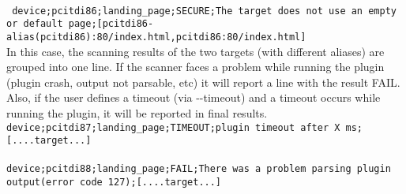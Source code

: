 \\
\texttt{
device;pcitdi86;landing\_page;SECURE;The target does not use an empty or default page;[pcitdi86-alias(pcitdi86):80/index.html,pcitdi86:80/index.html]
}
\\
In this case, the scanning results of the two targets (with different aliases) are grouped into one line.
If the scanner faces a problem while running the plugin (plugin crash, output not parsable, etc) it will report a line with the result FAIL. Also, if the user defines a timeout (via -{}-timeout) and a timeout occurs while running the plugin, it will be reported in final results.
\\ 
\texttt{device;pcitdi87;landing\_page;TIMEOUT;plugin timeout after X ms;[....target...]}
\\
\\
\texttt{device;pcitdi88;landing\_page;FAIL;There was a problem parsing plugin output(error code 127);[....target...]}
\\
\\
%
%
%    
%

